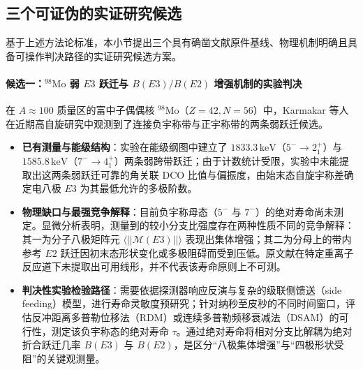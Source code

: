 \subsection{三个可证伪的实证研究候选}\label{sec:3-8-4}

基于上述方法论标准，本小节提出三个具有确凿文献原件基线、物理机制明确且具备可操作判决路径的实证研究候选方案。

\paragraph{候选一：$^{98}\mathrm{Mo}$ 弱 $E3$ 跃迁与 $B(E3)/B(E2)$ 增强机制的实验判决}
在 $A \approx 100$ 质量区的富中子偶偶核 $^{98}\mathrm{Mo}$（$Z=42, N=56$）中，Karmakar 等人在近期高自旋研究中观测到了连接负宇称带与正宇称带的两条弱跃迁候选。\cite{karmakar_2025_98mo_octupole}
\begin{itemize}
\item \textbf{已有测量与能级结构}：实验在能级纲图中建立了 $1833.3\,\mathrm{keV}$（$5^- \to 2_1^+$）与 $1585.8\,\mathrm{keV}$（$7^- \to 4_1^+$）两条弱跨带跃迁；由于计数统计受限，实验中未能提取出这两条弱跃迁可靠的角关联 DCO 比值与偏振度，由始末态自旋宇称差确定电八极 $E3$ 为其最低允许的多极阶数。
\item \textbf{物理缺口与最强竞争解释}：目前负宇称母态（$5^-$ 与 $7^-$）的绝对寿命尚未测定。显微分析表明，测量到的较小分支比强度存在两种性质不同的竞争解释：其一为分子八极矩阵元 $\langle || \mathcal{M}(E3) || \rangle$ 表现出集体增强；其二为分母上的带内参考 $E2$ 跃迁因初末态形状变化或多极阻碍而受到压低。原文献在特定重离子反应道下未提取出可用线形，并不代表该寿命原则上不可测。
\item \textbf{判决性实验检验路径}：需要依据探测器响应反演与复杂的级联侧馈送（side feeding）模型，进行寿命灵敏度预研究；针对纳秒至皮秒的不同时间窗口，评估反冲距离多普勒位移法（RDM）或连续多普勒频移衰减法（DSAM）的可行性，测定该负宇称态的绝对寿命 $\tau$。通过绝对寿命将相对分支比解耦为绝对折合跃迁几率 $B(E3)$ 与 $B(E2)$，是区分“八极集体增强”与“四极形状受阻”的关键观测量。
\end{itemize}

